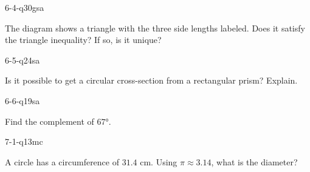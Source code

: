 \begin{practiceQuestion}{6-4-q30}{gsa}
\begin{questionText}
The diagram shows a triangle with the three side lengths labeled. Does it satisfy the triangle inequality? If so, is it unique?

\begin{center}
\end{center}
\end{questionText}
\end{practiceQuestion}

\begin{practiceQuestion}{6-5-q24}{sa}
\begin{questionText}
Is it possible to get a circular cross-section from a rectangular prism? Explain.
\end{questionText}
\end{practiceQuestion}

\begin{practiceQuestion}{6-6-q19}{sa}
\begin{questionText}
Find the complement of $67°$.
\end{questionText}
\end{practiceQuestion}

\begin{practiceQuestion}{7-1-q13}{mc}
\begin{questionText}
A circle has a circumference of $31.4$ cm. Using $\pi \approx 3.14$, what is the diameter?
\end{questionText}
\end{practiceQuestion}

